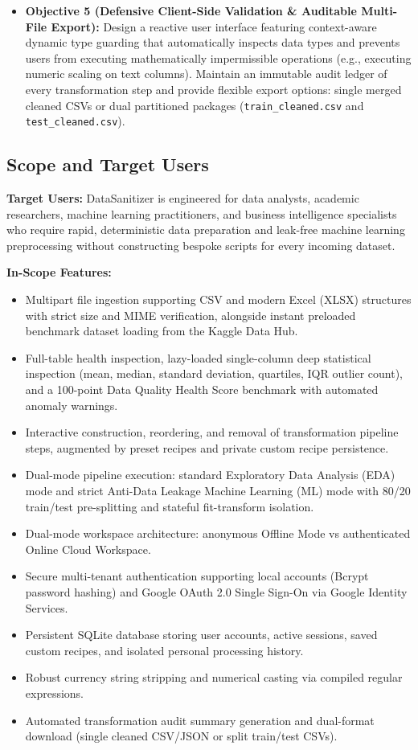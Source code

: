 \begin{itemize}
  \item \textbf{Objective 5 (Defensive Client-Side Validation \& Auditable Multi-File Export):} Design a reactive user interface featuring context-aware dynamic type guarding that automatically inspects data types and prevents users from executing mathematically impermissible operations (e.g., executing numeric scaling on text columns). Maintain an immutable audit ledger of every transformation step and provide flexible export options: single merged cleaned CSVs or dual partitioned packages (\texttt{train\_cleaned.csv} and \texttt{test\_cleaned.csv}).
\end{itemize}

\subsection{Scope and Target Users}
\textbf{Target Users:}
DataSanitizer is engineered for data analysts, academic researchers, machine learning practitioners, and business intelligence specialists who require rapid, deterministic data preparation and leak-free machine learning preprocessing without constructing bespoke scripts for every incoming dataset.

\textbf{In-Scope Features:}
\begin{itemize}
  \item Multipart file ingestion supporting CSV and modern Excel (XLSX) structures with strict size and MIME verification, alongside instant preloaded benchmark dataset loading from the Kaggle Data Hub.
  \item Full-table health inspection, lazy-loaded single-column deep statistical inspection (mean, median, standard deviation, quartiles, IQR outlier count), and a 100-point Data Quality Health Score benchmark with automated anomaly warnings.
  \item Interactive construction, reordering, and removal of transformation pipeline steps, augmented by preset recipes and private custom recipe persistence.
  \item Dual-mode pipeline execution: standard Exploratory Data Analysis (EDA) mode and strict Anti-Data Leakage Machine Learning (ML) mode with 80/20 train/test pre-splitting and stateful fit-transform isolation.
  \item Dual-mode workspace architecture: anonymous Offline Mode vs authenticated Online Cloud Workspace.
  \item Secure multi-tenant authentication supporting local accounts (Bcrypt password hashing) and Google OAuth 2.0 Single Sign-On via Google Identity Services.
  \item Persistent SQLite database storing user accounts, active sessions, saved custom recipes, and isolated personal processing history.
  \item Robust currency string stripping and numerical casting via compiled regular expressions.
  \item Automated transformation audit summary generation and dual-format download (single cleaned CSV/JSON or split train/test CSVs).
\end{itemize}

